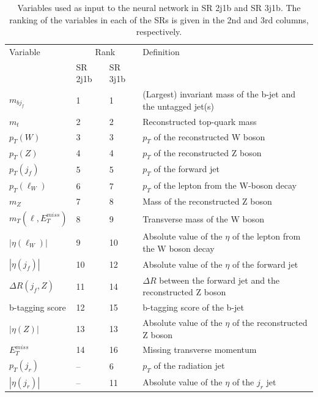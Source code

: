 \begin{table}[h!]
\centering
\begin{adjustbox}{width=\textwidth}
\begin{tabular}{@{} *4l  @{}}
\toprule
Variable & \multicolumn{2}{c}{Rank} & Definition \\
 & SR 2j1b & SR 3j1b &  \\
 \midrule
 $m_{bj_{f}}$ & 1 & 1 & (Largest) invariant mass of the b-jet and the untagged jet(s) \\[0.2ex]
 $m_{t}$   &  2 &  2 & Reconstructed top-quark mass \\[0.2ex]
 $p_{T}(W)$     &  3 & 3 & $p_{T}$ of the reconstructed W boson \\[0.2ex]
 $p_{T}(Z)$    & 4 &  4 & $p_{T}$ of the reconstructed Z boson \\[0.2ex]
 $p_{T}(j_{f})$    & 5 & 5 & $p_{T}$ of the forward jet\\[0.2ex]
 $p_{T}(\ell_{W})$ & 6 & 7 & $p_{T}$ of the lepton from the W-boson decay\\[0.2ex]
 $m_{Z}$   & 7 & 8 & Mass of the reconstructed Z boson\\[0.2ex]
 $m_{T}(\ell,E_{T}^{miss})$ &  8 &  9 & Transverse mass of the W boson \\[0.2ex]
 $|\eta(\ell_{W})|$ &  9 & 10 & Absolute value of the $\eta$ of the lepton from the W boson decay\\[0.2ex]
 $|\eta(j_{f})|$  &  10 &  12 & Absolute value of the $\eta$ of the forward jet\\[0.2ex]
$\Delta R(j_{f},Z)$ & 11 &  14 &  $\Delta R$ between the forward jet and the reconstructed Z boson \\[0.2ex]
b-tagging score   &  12 & 15 & b-tagging score of the b-jet \\[0.2ex]
$|\eta(Z)|$  & 13 & 13 & Absolute value of the $\eta$ of the reconstructed Z boson \\[0.2ex]
$E_{T}^{miss}$ & 14 & 16 & Missing transverse momentum \\[0.2ex]
$p_{T}(j_{r})$  &{--}& 6  & $p_{T}$ of the radiation jet \\[0.2ex]
$|\eta(j_{r})|$     & {--} &  11 & Absolute value of the $\eta$ of the $j_{r}$ jet \\[0.2ex]
\bottomrule
\end{tabular}
\end{adjustbox}
\caption{Variables used as input to the neural network in SR 2j1b and SR 3j1b. The ranking of the variables in each of the SRs is given in the 2nd and 3rd columns, respectively.}
\label{tab:NN_input}
\end{table}  


